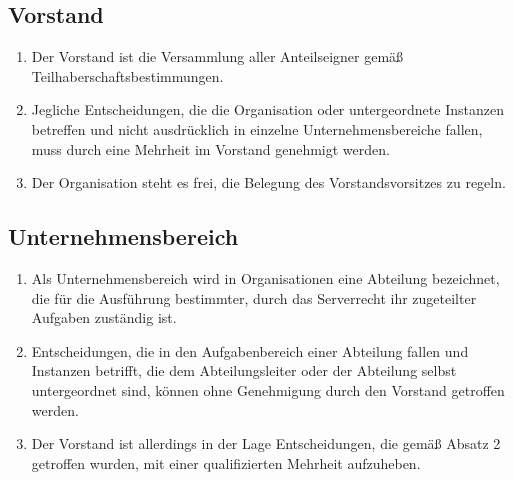 \documentclass{article}
\begin{document}
\subsection{Vorstand}
\begin{enumerate}[(1)]
	\item Der Vorstand ist die Versammlung aller Anteilseigner gemäß Teilhaberschaftsbestimmungen.
	\item Jegliche Entscheidungen, die die Organisation oder untergeordnete Instanzen betreffen und nicht ausdrücklich in einzelne Unternehmensbereiche fallen, muss durch eine Mehrheit im Vorstand genehmigt werden.
	\item Der Organisation steht es frei, die Belegung des Vorstandsvorsitzes zu regeln.
\end{enumerate}

\subsection{Unternehmensbereich}
\begin{enumerate}[(1)]
	\item Als Unternehmensbereich wird in Organisationen eine Abteilung bezeichnet, die für die Ausführung bestimmter, durch das Serverrecht ihr zugeteilter Aufgaben zuständig ist.
	\item Entscheidungen, die in den Aufgabenbereich einer Abteilung fallen und Instanzen betrifft, die dem Abteilungsleiter oder der Abteilung selbst untergeordnet sind, können ohne Genehmigung durch den Vorstand getroffen werden.
	\item Der Vorstand ist allerdings in der Lage Entscheidungen, die gemäß Absatz 2 getroffen wurden, mit einer qualifizierten Mehrheit aufzuheben.
\end{enumerate}
\end{document}
